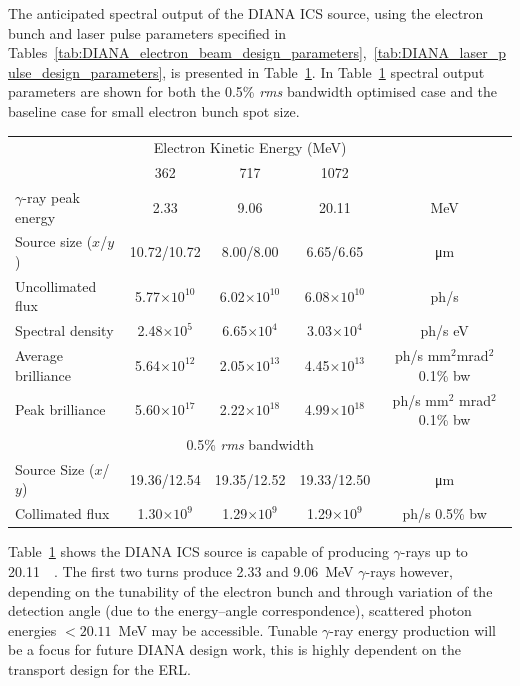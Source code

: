 \documentclass[../main.tex]{subfiles}
\begin{document}
The anticipated spectral output of the DIANA ICS source, using the electron bunch and laser pulse parameters specified in Tables~\ref{tab:DIANA_electron_beam_design_parameters},~\ref{tab:DIANA_laser_pulse_design_parameters}, is presented in Table~\ref{tab:DIANA_spectral_output}. In Table~\ref{tab:DIANA_spectral_output} spectral output parameters are shown for both the 0.5\% \textit{rms} bandwidth optimised case and the baseline case for small electron bunch spot size.

\begin{table}[!h]
\centering
\begin{tabular}{lcccc}
\hline\hline
 & \multicolumn{3}{c}{Electron Kinetic Energy (\si{\mega\electronvolt})} & \\
 \cline{2-4}
 & 362 & 717 & 1072 & \\
\hline
$\gamma$-ray peak energy  & 2.33 & 9.06 & 20.11 & \si{\mega\electronvolt}\\
Source size ($x$/$y$)  & 10.72/10.72 & 8.00/8.00 & 6.65/6.65 & \si{\micro\meter} \\
Uncollimated flux  & 5.77$\times 10^{10}$ & 6.02$\times 10^{10}$ & 6.08$\times 10^{10}$ & ph/\si{\second}\\
Spectral density  & 2.48$\times 10^{5}$ & 6.65$\times 10^{4}$ & 3.03$\times 10^{4}$ & ph/\si{\second} \si{\electronvolt}\\
Average brilliance  & 5.64$\times 10^{12}$ & 2.05$\times 10^{13}$ & 4.45$\times 10^{13}$ & ph/\si{\second} \si{\milli\meter}$^{2}$\si{\milli\radian}$^{2}$ 0.1\% bw\\
Peak brilliance  & 5.60$\times 10^{17}$ & 2.22$\times 10^{18}$ & 4.99$\times 10^{18}$ & ph/\si{\second} \si{\milli\meter}$^{2}$ \si{\milli\radian}$^{2}$ 0.1\% bw\\
\hline
 & \multicolumn{3}{c}{0.5\% \textit{rms} bandwidth} & \\
\hline
Source Size ($x$/$y$) & 19.36/12.54 & 19.35/12.52 & 19.33/12.50 & \si{\micro\meter} \\ 
Collimated flux  & 1.30$\times 10^{9}$ & 1.29$\times 10^{9}$ & 1.29$\times 10^{9}$ & ph/\si{\second} 0.5\% bw \\
\hline\hline
\end{tabular}
\label{tab:DIANA_spectral_output}
\end{table}

Table~\ref{tab:DIANA_spectral_output} shows the DIANA ICS source is capable of producing $\gamma$-rays up to 20.11~\si{\mega\electronvolts}. The first two turns produce 2.33 and 9.06~\si{\mega\electronvolt} $\gamma$-rays however, depending on the tunability of the electron bunch and through variation of the detection angle (due to the energy--angle correspondence), scattered photon energies $< 20.11$~\si{\mega\electronvolt} may be accessible. Tunable $\gamma$-ray energy production will be a focus for future DIANA design work, this is highly dependent on the transport design for the ERL. 
\end{document}
